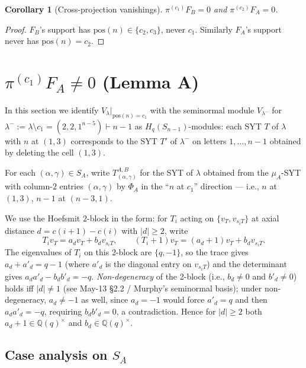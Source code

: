 \documentclass[11pt]{article}
\newtheorem{corollary}[theorem]{Corollary}
\theoremstyle{definition}
\begin{document}
\begin{corollary}[Cross-projection vanishings]\label{cor:cross}
$\pi^{(c_1)} F_B = 0$ and $\pi^{(c_2)} F_A = 0$.
\end{corollary}

\begin{proof}
$F_B$'s support has $\mathrm{pos}(n) \in \{c_2, c_3\}$, never $c_1$.
Similarly $F_A$'s support never has $\mathrm{pos}(n) = c_2$.
\end{proof}

\section{$\pi^{(c_1)} F_A \ne 0$ (Lemma A)}\label{sec:LemmaA}

In this section we identify $V_\lambda|_{\mathrm{pos}(n) = c_1}$
with the seminormal module $V_{\lambda^-}$ for
$\lambda^- := \lambda \setminus c_1 = (2, 2, 1^{n-5}) \vdash n-1$ as
$H_q(S_{n-1})$-modules: each SYT $T$ of $\lambda$ with $n$ at
$(1, 3)$ corresponds to the SYT $T'$ of $\lambda^-$ on letters
$1, \ldots, n-1$ obtained by deleting the cell $(1, 3)$.

For each $(\alpha, \gamma) \in S_A$, write
$T^{A,B}_{(\alpha, \gamma)}$ for the SYT of $\lambda$ obtained from
the $\mu_A$-SYT with column-$2$ entries $(\alpha, \gamma)$ by
$\Phi_A$ in the ``$n$ at $c_1$'' direction --- i.e.,
$n$ at $(1, 3)$, $n-1$ at $(n-3, 1)$.

We use the Hoefsmit $2$-block in the form: for $T_i$ acting
on $\{v_T, v_{s_iT}\}$ at axial distance $d = c(i{+}1) - c(i)$ with
$|d| \ge 2$, write
\begin{equation}\label{eq:hoefsmit}
   T_i v_T = a_d v_T + b_d v_{s_iT},
   \qquad
   (T_i{+}1) v_T = (a_d{+}1) v_T + b_d v_{s_iT}.
\end{equation}
The eigenvalues of $T_i$ on this 2-block are $\{q, -1\}$, so the
trace gives $a_d + a'_d = q-1$ (where $a'_d$ is the diagonal entry
on $v_{s_iT}$) and the determinant gives $a_d a'_d - b_d b'_d = -q$.
\emph{Non-degeneracy} of the 2-block (i.e., $b_d \ne 0$ and
$b'_d \ne 0$) holds iff $|d| \ne 1$
(see May-13 \S 2.2 / Murphy's seminormal basis); under
non-degeneracy, $a_d \ne -1$ as well, since $a_d = -1$ would force
$a'_d = q$ and then $a_d a'_d = -q$, requiring $b_d b'_d = 0$, a
contradiction. Hence for $|d| \ge 2$ both $a_d + 1 \in \mathbb{Q}(q)^\times$
and $b_d \in \mathbb{Q}(q)^\times$.

\subsection{Case analysis on $S_A$}
\end{document}
